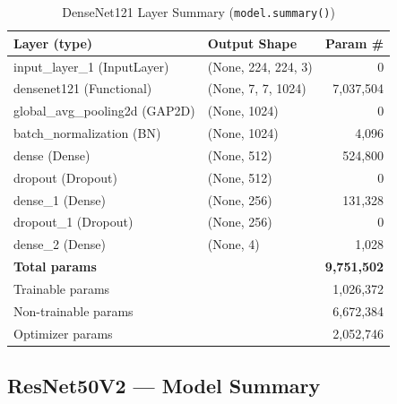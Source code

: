 \documentclass[12pt,a4paper]{article}
\begin{document}
\begin{table}[H]
\centering
\caption{DenseNet121 Layer Summary (\texttt{model.summary()})}
\label{tab:summary_densenet121}
\begin{tabular}{l l r}
  \toprule
  \textbf{Layer (type)} & \textbf{Output Shape} & \textbf{Param \#} \\
  \midrule
  input\_layer\_1 (InputLayer)         & (None, 224, 224, 3)  &           0 \\
  densenet121 (Functional)             & (None, 7, 7, 1024)   &   7,037,504 \\
  global\_avg\_pooling2d (GAP2D)       & (None, 1024)         &           0 \\
  batch\_normalization (BN)            & (None, 1024)         &       4,096 \\
  dense (Dense)                        & (None, 512)          &     524,800 \\
  dropout (Dropout)                    & (None, 512)          &           0 \\
  dense\_1 (Dense)                     & (None, 256)          &     131,328 \\
  dropout\_1 (Dropout)                 & (None, 256)          &           0 \\
  dense\_2 (Dense)                     & (None, 4)            &       1,028 \\
  \midrule
  \multicolumn{2}{l}{\textbf{Total params}}    & \textbf{9,751,502} \\
  \multicolumn{2}{l}{Trainable params}         &      1,026,372 \\
  \multicolumn{2}{l}{Non-trainable params}     &      6,672,384 \\
  \multicolumn{2}{l}{Optimizer params}         &      2,052,746 \\
  \bottomrule
\end{tabular}
\end{table}

\subsection{ResNet50V2 --- Model Summary}
\end{document}
